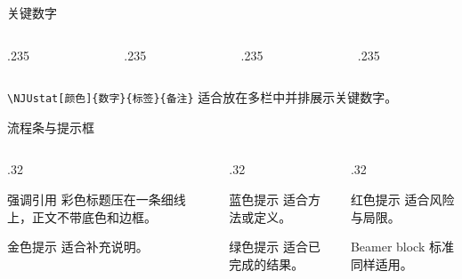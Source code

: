 \documentclass[aspectratio=169,10pt]{beamer}
\begin{document}
\begin{frame}[t]{关键数字}
\begin{columns}[T,onlytextwidth]
  \begin{column}{.235\textwidth}\end{column}
  \begin{column}{.235\textwidth}\end{column}
  \begin{column}{.235\textwidth}\end{column}
  \begin{column}{.235\textwidth}\end{column}
\end{columns}

\vspace{4pt}
\texttt{\textbackslash NJUstat[颜色]\{数字\}\{标签\}\{备注\}} 适合放在多栏中并排展示关键数字。

\end{frame}

\begin{frame}[t]{流程条与提示框}

\vspace{6pt}
\begin{columns}[T,onlytextwidth]
  \begin{column}{.32\textwidth}
    \begin{njuquote}{强调引用}
      彩色标题压在一条细线上，正文不带底色和边框。
    \end{njuquote}
    \begin{njuquotegold}{金色提示}
      适合补充说明。
    \end{njuquotegold}
  \end{column}
  \begin{column}{.32\textwidth}
    \begin{njuquoteblue}{蓝色提示}
      适合方法或定义。
    \end{njuquoteblue}
    \begin{njuquotegreen}{绿色提示}
      适合已完成的结果。
    \end{njuquotegreen}
  \end{column}
  \begin{column}{.32\textwidth}
    \begin{njuquotered}{红色提示}
      适合风险与局限。
    \end{njuquotered}
    \begin{block}{Beamer block}
      标准  同样适用。
    \end{block}
  \end{column}
\end{columns}
\end{frame}
\end{document}
